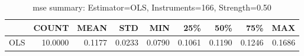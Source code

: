 \begin{table}[ht]
\centering
\caption{mse summary: Estimator=OLS, Instruments=166, Strength=0.50}
\begin{tabular}{lrrrrrrrr}
\toprule
 & COUNT & MEAN & STD & MIN & 25\% & 50\% & 75\% & MAX \\
\midrule
OLS & 10.0000 & 0.1177 & 0.0233 & 0.0790 & 0.1061 & 0.1190 & 0.1246 & 0.1686 \\
\bottomrule
\end{tabular}
\end{table}
